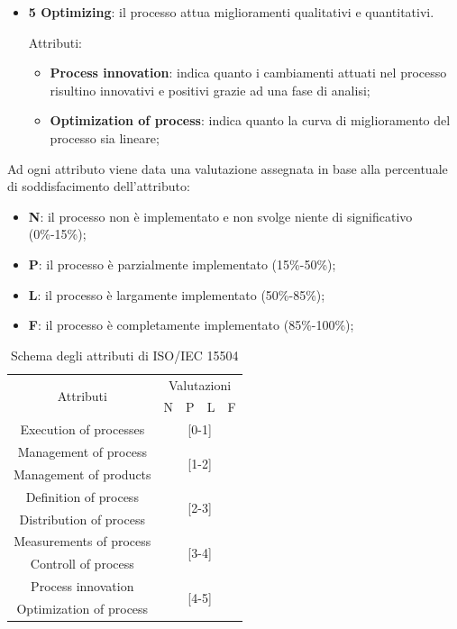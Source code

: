 \begin{itemize}
		\item \textbf{5 Optimizing}: il processo attua miglioramenti qualitativi e quantitativi.
		
		Attributi:
		
		\begin{itemize}
			\item \textbf{Process innovation}: indica quanto i cambiamenti attuati nel processo risultino innovativi e positivi grazie ad una fase di analisi;
			\item \textbf{Optimization of process}: indica quanto la curva di miglioramento del processo sia lineare;
		\end{itemize}
	\end{itemize}
	
	Ad ogni attributo viene data una valutazione assegnata in base alla percentuale di soddisfacimento dell'attributo:
	
	\begin{itemize}
		\item \textbf{N}: il processo non è implementato e non svolge niente di significativo (0\%-15\%);
		\item \textbf{P}: il processo è parzialmente implementato (15\%-50\%);
		\item \textbf{L}: il processo è largamente implementato (50\%-85\%);
		\item \textbf{F}: il processo è completamente implementato (85\%-100\%); 
	\end{itemize}
	
	\begin{table}[h]
	\centering
	\begin{tabular}{ccccc}
		
		\toprule
		\multirow{2}{*}{Attributi} & \multicolumn{4}{c}{Valutazioni}\\
		\cmidrule(lr){2-5} & N & P & L & F\\
		\midrule Execution of processes & \multicolumn{4}{c}{[0-1]}\\
		\midrule Management of process & \multicolumn{4}{c}{\multirow{2}{*}{[1-2]}}\\
		Management of products\\
		\midrule Definition of process & \multicolumn{4}{c}{\multirow{2}{*}{[2-3]}}\\
		Distribution of process\\
		\midrule Measurements of process & \multicolumn{4}{c}{\multirow{2}{*}{[3-4]}}\\
		Controll of process\\
		\midrule Process innovation & \multicolumn{4}{c}{\multirow{2}{*}{[4-5]}}\\
		Optimization of process\\
		\bottomrule
		
		
		
	\end{tabular}
	\label{tab:spice}
	\caption{Schema degli attributi di ISO/IEC 15504}
	\end{table}

